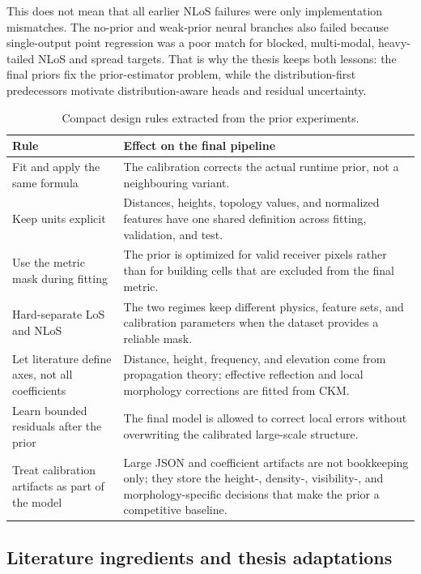 This does not mean that all earlier NLoS failures were only implementation
mismatches. The no-prior and weak-prior neural branches also failed because
single-output point regression was a poor match for blocked, multi-modal,
heavy-tailed NLoS and spread targets. That is why the thesis keeps both
lessons: the final priors fix the prior-estimator problem, while
the distribution-first predecessors motivate distribution-aware heads and residual
uncertainty.

\begin{table}[H]
\centering
\caption{Compact design rules extracted from the prior experiments.}
\label{tab:prior_design_rules}
\small
\begin{tabularx}{\textwidth}{>{\raggedright\arraybackslash}p{}
>{\raggedright\arraybackslash}X}
\toprule
Rule & Effect on the final pipeline \\
\midrule
Fit and apply the same formula &
The calibration corrects the actual runtime prior, not a neighbouring variant. \\
Keep units explicit &
Distances, heights, topology values, and normalized features have one shared
definition across fitting, validation, and test. \\
Use the metric mask during fitting &
The prior is optimized for valid receiver pixels rather than for building cells
that are excluded from the final metric. \\
Hard-separate LoS and NLoS &
The two regimes keep different physics, feature sets, and calibration
parameters when the dataset provides a reliable mask. \\
Let literature define axes, not all coefficients &
Distance, height, frequency, and elevation come from propagation theory;
effective reflection and local morphology corrections are fitted from CKM. \\
Learn bounded residuals after the prior &
The final model is allowed to correct local errors without overwriting the calibrated
large-scale structure. \\
Treat calibration artifacts as part of the model &
Large JSON and coefficient artifacts are not bookkeeping only; they store the
height-, density-, visibility-, and morphology-specific decisions that make the
prior a competitive baseline. \\
\bottomrule
\end{tabularx}
\end{table}

\subsection{Literature ingredients and thesis adaptations}

